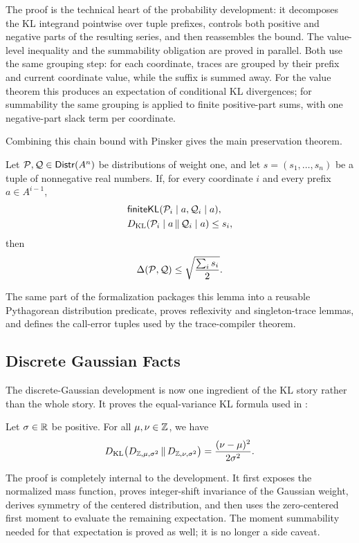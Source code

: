 The proof is the technical heart of the probability development: it decomposes the KL integrand pointwise over tuple prefixes, controls both positive and negative parts of the resulting series, and then reassembles the bound.
The value-level inequality and the summability obligation are proved in parallel.
Both use the same grouping step: for each coordinate, traces are grouped by their prefix and current coordinate value, while the suffix is summed away.
For the value theorem this produces an expectation of conditional KL divergences; for summability the same grouping is applied to finite positive-part sums, with one negative-part slack term per coordinate.

Combining this chain bound with Pinsker gives the main preservation theorem.
\begin{lemma}
\label{lem:verified-pythagorean-preservation}
Let $\mathcal{P},\mathcal{Q}\in\mathsf{Distr}(A^n)$ be distributions of weight one, and let
$s=(s_1,\ldots,s_n)$ be a tuple of nonnegative real numbers.
If, for every coordinate $i$ and every prefix $a\in A^{i-1}$,
\begin{align*}
  &\mathsf{finiteKL}(\mathcal{P}_i\mid a,\mathcal{Q}_i\mid a),\\
  &D_{\mathrm{KL}}\!\left(\mathcal{P}_i\mid a\,\|\,\mathcal{Q}_i\mid a\right)\leq s_i,
\end{align*}
then
\[
  \Delta(\mathcal{P},\mathcal{Q})
  \leq
  \sqrt{\frac{\sum_i s_i}{2}}.
\]
\end{lemma}
The same part of the formalization packages this lemma into a reusable Pythagorean distribution predicate, proves reflexivity and singleton-trace lemmas, and defines the call-error tuples used by the trace-compiler theorem.

\subsection{Discrete Gaussian Facts}

The discrete-Gaussian development is now one ingredient of the KL story rather than the whole story.
It proves the equal-variance KL formula used in :
\begin{lemma}
\label{lem:dg-kl}
Let $\sigma\in\mathbb{R}$ be positive.
For all $\mu, \nu\in\mathbb{Z}$, we have
\[
  D_{\mathrm{KL}}\!\left(D_{\mathbb{Z},\mu,\sigma^2}\,\|\,D_{\mathbb{Z},\nu,\sigma^2}\right)
  =
  \frac{(\nu-\mu)^2}{2\sigma^2}.
\]
\end{lemma}
The proof is completely internal to the development.
It first exposes the normalized mass function, proves integer-shift invariance of the Gaussian weight, derives symmetry of the centered distribution, and then uses the zero-centered first moment to evaluate the remaining expectation.
The moment summability needed for that expectation is proved as well; it is no longer a side caveat.

